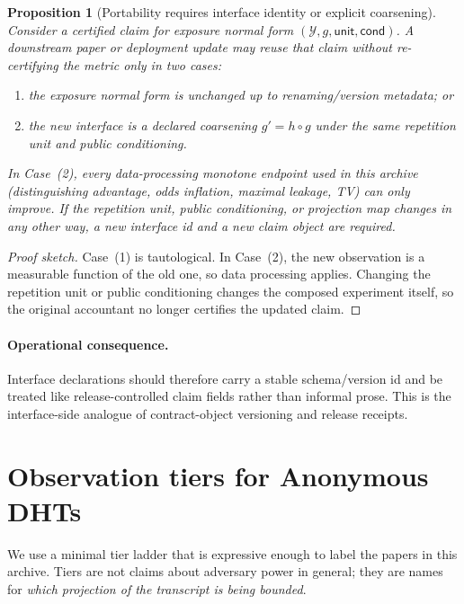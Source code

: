\documentclass[11pt]{article}
\newtheorem{proposition}{Proposition}
\begin{document}
\begin{proposition}[Portability requires interface identity or explicit coarsening]
\label{prop:interface-portability}
Consider a certified claim for exposure normal form $(\mathcal Y,g,\mathsf{unit},\mathsf{cond})$.
A downstream paper or deployment update may reuse that claim without re-certifying the metric only in two cases:
\begin{enumerate}[leftmargin=*]
\item the exposure normal form is unchanged up to renaming/version metadata; or
\item the new interface is a declared coarsening $g' = h\circ g$ under the same repetition unit and public conditioning.
\end{enumerate}
In Case~(2), every data-processing monotone endpoint used in this archive (distinguishing advantage, odds inflation, maximal leakage, TV) can only improve.
If the repetition unit, public conditioning, or projection map changes in any other way, a new interface id and a new claim object are required.
\end{proposition}

\begin{proof}[Proof sketch]
Case~(1) is tautological.
In Case~(2), the new observation is a measurable function of the old one, so data processing applies.
Changing the repetition unit or public conditioning changes the composed experiment itself, so the original accountant no longer certifies the updated claim.
\end{proof}

\paragraph{Operational consequence.}
Interface declarations should therefore carry a stable schema/version id and be treated like release-controlled claim fields rather than informal prose.
This is the interface-side analogue of contract-object versioning and release receipts.\cite{series:contractobjects,series:releaseproperty}

\section{Observation tiers for Anonymous DHTs}\label{sec:tiers}
We use a minimal tier ladder that is expressive enough to label the papers in this archive.
Tiers are not claims about adversary power in general; they are names for \emph{which projection of the transcript is being bounded}.
\end{document}

